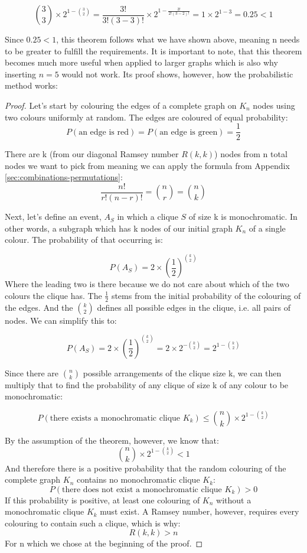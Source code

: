 \documentclass[12pt, a4paper]{article}   %
\begin{document}
\[
\binom{3}{3} \times 2^{1-\binom{3}{2}} = \frac{3!}{3!(3-3)!}\times 2^{1-\frac{3!}{2!(3-2)!}} = 1 \times 2^{1-3} = 0.25 < 1
\]

Since  \(0.25 < 1\), this theorem follows what we have shown above, meaning n needs to be greater to fulfill the requirements. It is important to note, that this theorem becomes much more useful when applied to larger graphs which is also why inserting \(n =5\) would not work. Its proof shows, however, how the probabilistic method works:

\begin{proof}
    Let's start by colouring the edges of a complete graph on \( K_n \) nodes using two colours uniformly at random. The edges are coloured of equal probability:
    \[
        P(\text{an edge is red}) = P(\text{an edge is green}) = \frac{1}{2}
    \] 
    
There are k (from our diagonal Ramsey number \( R(k,k)\)) nodes from n total nodes we want to pick from meaning we can apply the formula from Appendix \ref{sec:combinations-permutations}: 
\[
    \frac{n!}{r!(n-r)!} = \binom{n}{r} = \binom{n}{k}
\]

Next, let's define an event, \( A_S \) in which a clique \( S \) of size k is monochromatic. In other words, a subgraph which has k nodes of our initial graph \( K_n \) of a single colour. The probability of that occurring is:

\[
    P(A_S) = 2 \times \left(\frac{1}{2}\right)^{\binom{k}{2}}
\]
Where the leading two is there because we do not care about which of the two colours the clique has. The \( \frac{1}{2} \) stems from the initial probability of the colouring of the edges. And the \( \binom{k}{2} \) defines all possible edges in the clique, i.e. all pairs of nodes. We can simplify this to:

\[
    P(A_S) = 2 \times \left(\frac{1}{2}\right)^{\binom{k}{2}} = 2 \times 2^{-\binom{k}{2}} = 2^{1-\binom{k}{2}}
\]

Since there are \( \binom{n}{k} \) possible arrangements of the clique size k, we can then multiply that to find the probability of any clique of size k of any colour to be monochromatic:

\begin{equation} \label{eq:union-bound-clique}
   P(\text{there exists a monochromatic clique } K_k) \leq \binom{n}{k} \times 2^{1-\binom{k}{2}}
\end{equation}

By the assumption of the theorem, however, we know that:
\[
    \binom{n}{k} \times 2^{1-\binom{k}{2}} < 1 
\]
And therefore there is a positive probability that the random colouring of the complete graph \( K_n \) contains no monochromatic clique \( K_k \):
\[
    P(\text{there does not exist a monochromatic clique } K_k) > 0
\]
If this probability is positive, at least one colouring of \( K_n \) without a monochromatic clique \( K_k \) must exist. A Ramsey number, however, requires every colouring to contain such a clique, which is why:
\[
    R(k,k) > n
\]
For n which we chose at the beginning of the proof.


\end{proof}
\end{document}
